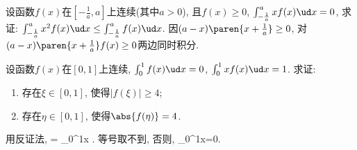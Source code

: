 \bq{}{}
设函数$f(x)$在$\left[-\frac1a,a\right]$上连续(其中$a>0$), 且$f(x)\ge0$, $\int_{-\frac1a}^{a}xf(x)\ud x=0$, 求证: $\int_{-\frac1a}^ax^2f(x)\ud x\le\int_{-\frac1a}^af(x)\ud x$.
\eq
\ba
因$(a-x)\paren{x+\frac1a}\ge0$, 对$(a-x)\paren{x+\frac1a}f(x)\ge0$两边同时积分.
\ea

\bq{}{}
设函数$f(x)$在$[0,1]$上连续, $\int_0^1f(x)\ud x=0$, $\int_0^1xf(x)\ud x=1$. 求证: 
\begin{enumerate}[1.]
 \item 存在$\xi\in[0,1]$, 使得$|f(\xi)|\ge4$;
 \item 存在$\eta\in[0,1]$, 使得$\abs{f(\eta)}=4$.
\end{enumerate}
\eq
\ba
用反证法, 
=
  \le \int_0^1\cdot{}\ud x
  .
\eee
等号取不到, 否则, 
\bee
\int_0^1\ud x=0.
\eee
\ea

